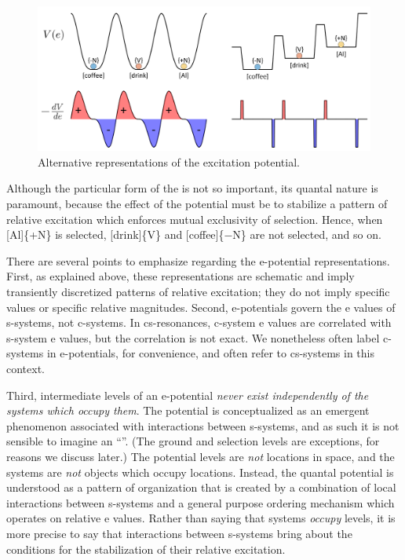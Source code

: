   
\begin{figure}
\includegraphics[width=\textwidth]{figures/Tilsen-img24.png}
\caption{Alternative representations of the excitation potential.}
\label{fig:2:17}
\end{figure}
 

  Although the particular form of the  is not so important, its quantal nature is paramount, because the effect of the potential must be to stabilize a pattern of relative excitation which enforces mutual exclusivity of selection. Hence, when [Al]\{+N\} is selected, [drink]\{V\} and [coffee]\{−N\} are not selected, and so on. 

  There are several points to emphasize regarding the e-potential representations. First, as explained above, these representations are schematic and imply transiently discretized patterns of relative excitation; they do not imply specific values or specific relative magnitudes. Second, e-potentials govern the e values of s-systems, not c-systems. In cs-resonances, c-system e values are correlated with s-system e values, but the correlation is not exact. We nonetheless often label c-systems in e-potentials, for convenience, and often refer to cs-systems in this context. 

  Third, intermediate levels of an e-potential \textit{never exist independently of the systems which occupy them}. The potential is conceptualized as an emergent phenomenon associated with interactions between s-systems, and as such it is not sensible to imagine an “”. (The ground and selection levels are exceptions, for reasons we discuss later.) The potential levels are \textit{not} locations in space, and the systems are \textit{not} objects which occupy locations. Instead, the quantal potential is understood as a pattern of organization that is created by a combination of local interactions between s-systems and a general purpose ordering mechanism which operates on relative e values. Rather than saying that systems \textit{occupy} levels, it is more precise to say that interactions between s-systems bring about the conditions for the stabilization of their relative excitation.

